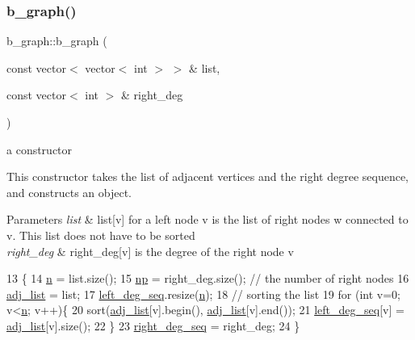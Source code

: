 \subsubsection{\texorpdfstring{b\+\_\+graph()}{b\_graph()}\hspace{0.1cm}{\footnotesize\ttfamily [3/4]}}
{\footnotesize\ttfamily b\+\_\+graph\+::b\+\_\+graph (\begin{DoxyParamCaption}\item[{const vector$<$ vector$<$ int $>$ $>$ \&}]{list,  }\item[{const vector$<$ int $>$ \&}]{right\+\_\+deg }\end{DoxyParamCaption})}



a constructor 

This constructor takes the list of adjacent vertices and the right degree sequence, and constructs an object. 
\begin{DoxyParams}{Parameters}
{\em list} & list\mbox{[}v\mbox{]} for a left node v is the list of right nodes w connected to v. This list does not have to be sorted \\
\hline
{\em right\+\_\+deg} & right\+\_\+deg\mbox{[}v\mbox{]} is the degree of the right node v \\
\hline
\end{DoxyParams}

\begin{DoxyCode}
13 \{
14   \hyperlink{classb__graph_a9e211d40c1799bc9b125de472ff06642}{n} = list.size();
15   \hyperlink{classb__graph_acffdd5f20329515eb6ec17ad24f1ca64}{np} = right\_deg.size(); \textcolor{comment}{// the number of right nodes}
16   \hyperlink{classb__graph_a2a89d2e8f958270952aab2e8769b7342}{adj\_list} = list;
17   \hyperlink{classb__graph_a311d16462dbb10c47b3a6c80a42139d9}{left\_deg\_seq}.resize(\hyperlink{classb__graph_a9e211d40c1799bc9b125de472ff06642}{n});
18   \textcolor{comment}{// sorting the list}
19   \textcolor{keywordflow}{for} (\textcolor{keywordtype}{int} v=0; v<\hyperlink{classb__graph_a9e211d40c1799bc9b125de472ff06642}{n}; v++)\{
20      sort(\hyperlink{classb__graph_a2a89d2e8f958270952aab2e8769b7342}{adj\_list}[v].begin(), \hyperlink{classb__graph_a2a89d2e8f958270952aab2e8769b7342}{adj\_list}[v].end()); 
21     \hyperlink{classb__graph_a311d16462dbb10c47b3a6c80a42139d9}{left\_deg\_seq}[v] = \hyperlink{classb__graph_a2a89d2e8f958270952aab2e8769b7342}{adj\_list}[v].size();
22   \}
23   \hyperlink{classb__graph_ae4c875ed6a583a78f38dfe958f20fad5}{right\_deg\_seq} = right\_deg;
24 \}
\end{DoxyCode}
\mbox{\label{classb__graph_a070770b36a9d003289813dde31238263}} 
